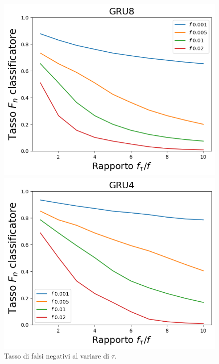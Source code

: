 \documentclass{beamer}
\begin{document}
\begin{frame}
\begin{figure}[htbp]
\begin{minipage}{0.25\textwidth}
        \centering
        \includegraphics[width=\textwidth]{immagini/7/SLBF/GRU8_FNR.png}
        \end{minipage}%
        \hfill
        \begin{minipage}{0.25\textwidth}
        \centering
        \includegraphics[width=\textwidth]{immagini/7/SLBF/GRU4_FNR.png}
        \end{minipage}%
        \hfill
    
        \begin{minipage}[t]{\textwidth}
        \centering
        \caption{Tasso di falsi negativi al variare di $\tau$.}
        \end{minipage}%
    \end{figure}
    \end{frame}
\end{document}
